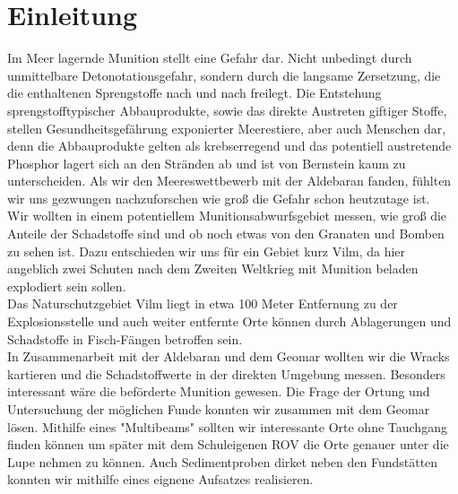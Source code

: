  

\chapter[Einleitung]{Einleitung}

Im Meer lagernde Munition stellt eine Gefahr dar. Nicht unbedingt durch unmittelbare Detonotationsgefahr, 
sondern durch die langsame Zersetzung, die die enthaltenen Sprengstoffe nach und nach 
freilegt\cite{zeitbomben}. Die Entstehung sprengstofftypischer Abbauprodukte, sowie das direkte Austreten 
giftiger Stoffe, stellen Gesundheitsgefährung exponierter Meerestiere, aber auch Menschen dar, denn die
Abbauprodukte gelten als krebserregend und das potentiell austretende Phosphor lagert sich an den Stränden 
ab und ist von Bernstein kaum zu unterscheiden. Als wir den Meereswettbewerb mit der Aldebaran fanden, 
fühlten wir uns gezwungen nachzuforschen wie groß die Gefahr schon heutzutage ist.\\

Wir wollten in einem potentiellem Munitionsabwurfsgebiet messen, wie groß die Anteile der Schadstoffe sind und 
ob noch etwas von den Granaten und Bomben zu sehen ist. Dazu entschieden wir uns für ein Gebiet kurz Vilm,
da hier angeblich zwei Schuten nach dem Zweiten Weltkrieg mit Munition beladen explodiert sein sollen.\\

Das Naturschutzgebiet Vilm liegt in etwa 100 Meter Entfernung zu der Explosionsstelle und auch weiter 
entfernte Orte können durch Ablagerungen und Schadstoffe in Fisch-Fängen betroffen sein.\\

In Zusammenarbeit mit der Aldebaran und dem Geomar wollten wir die Wracks kartieren und die Schadstoffwerte in
der direkten Umgebung messen. Besonders interessant wäre die beförderte Munition gewesen. Die Frage der
Ortung und Untersuchung der möglichen Funde konnten wir zusammen mit dem Geomar lösen. Mithilfe eines 
"Multibeams" sollten wir interessante Orte ohne Tauchgang finden können um später mit dem Schuleigenen 
ROV die Orte genauer unter die Lupe nehmen zu können. Auch Sedimentproben dirket neben den Fundstätten 
konnten wir mithilfe eines eignene Aufsatzes realisieren.\\

